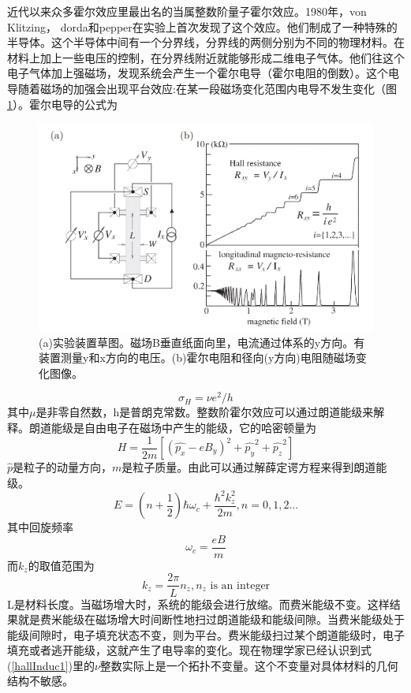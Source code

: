 近代以来众多霍尔效应里最出名的当属整数阶量子霍尔效应。1980年，von Klitzing， dorda和pepper在实验上首次发现了这个效应\cite{intHall}。他们制成了一种特殊的半导体。这个半导体中间有一个分界线，分界线的两侧分别为不同的物理材料。在材料上加上一些电压的控制，在分界线附近就能够形成二维电子气体。他们往这个电子气体加上强磁场，发现系统会产生一个霍尔电导（霍尔电阻的倒数）。这个电导随着磁场的加强会出现平台效应:在某一段磁场变化范围内电导不发生变化（图\ref{integerHall}）。霍尔电导的公式为
\begin {figure}[tbp]
\centering 
\includegraphics[width=12cm]{./images/hallR.jpg} 
\caption{(a)实验装置草图。磁场B垂直纸面向里，电流通过体系的y方向。有装置测量y和x方向的电压。(b)霍尔电阻和径向(y方向)电阻随磁场变化图像。\cite{hallR}}
\label{integerHall}
\end {figure}
\begin{equation}
  \sigma_H = \nu e^2 / h
  \label{hallInduc1}
\end{equation}
其中$\mu$是非零自然数，h是普朗克常数。整数阶霍尔效应可以通过朗道能级来解释。朗道能级是自由电子在磁场中产生的能级，它的哈密顿量为
\begin{equation}
  H = \frac{1}{2m}[(\hat{p_x} - e B_y)^2 + \hat{p_y}^2 + \hat{p_z}^2]
\end{equation}
$\hat{p}$是粒子的动量方向，$m$是粒子质量。由此可以通过解薛定谔方程来得到朗道能级。
\begin{equation}
  E = (n + \frac{1}{2})\hbar \omega_c + \frac{\hbar^2 k_z^2}{2m}, n = 0, 1, 2...
\end{equation}
其中回旋频率
\begin{equation}
  \omega_c = \frac{eB}{m}
\end{equation}
而$k_z$的取值范围为
\begin{equation}
  k_z = \frac{2 \pi}{L} n_z, n_z \mbox{ is an integer}
\end{equation}
L是材料长度。当磁场增大时，系统的能级会进行放缩。而费米能级不变。这样结果就是费米能级在磁场增大时间断性地扫过朗道能级和能级间隙。当费米能级处于能级间隙时，电子填充状态不变，则为平台。费米能级扫过某个朗道能级时，电子填充或者逃开能级，这就产生了电导率的变化。现在物理学家已经认识到式(\ref{hallInduc1})里的$\nu$整数实际上是一个拓扑不变量\cite{nuIsTopo}。这个不变量对具体材料的几何结构不敏感。


